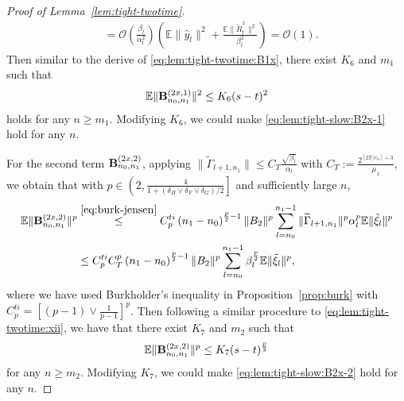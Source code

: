 \documentclass[11pt]{article}
\theoremstyle{plain}
\theoremstyle{definition}
\def\Hsmooth{{\delta_H}}
\def\Fsmooth{{\delta_F}}
\def\Gsmooth{{\delta_G}}
\def\cti{C^{ti}}
\def\OM{{\mathcal O}}
\def\EB{{\mathbb E}}
\newcommand{\yhat}{{\hat{y}}}
\newcommand{\ssum}[3]{\sum\limits_{{#1}={#2}}^{#3}}
\def\bfB{{\bf B}}
\begin{document}
\begin{appendix}
\begin{proof}[Proof of Lemma~\ref{lem:tight-twotime}]
\begin{align*}
        & = \OM \left( \frac{\beta_{l}}{\alpha_{l}^2} \right) \left( \EB \| \yhat_{l} \|^2 + \frac{ \EB \| \tilde{R}^x_{l} \|^2 }{ \beta_{l}^2 } \right) = \OM(1).
    \end{align*}
    Then similar to the derive of \eqref{eq:lem:tight-twotime:B1x}, there exist  $K_6$ and $m_1$ such that
    \begin{align}\label{eq:lem:tight-slow:B2x-1}
        \EB \| \bfB^{(2x,1)}_{n_0,n_1} \|^2 \le K_6 (s-t)^2
    \end{align}
    holds for any $n \ge m_1$.
    Modifying $K_6$, we could make \eqref{eq:lem:tight-slow:B2x-1} hold for any $n$.
    
    For the second term $\bfB^{(2x,2)}_{n_0,n_1}$,
    applying $\| \widetilde{\Gamma}_{l+1,n_1} \| \le C_T \frac{ \sqrt{\beta_{l}} }{ \alpha_{l} } $ with $C_T := \frac{ 2^{ \left\lceil 2T/c_\alpha \right\rceil + 3} }{\mu_1}$, we obtain that with $p \in \left(2, \frac{4}{1 + ( \Hsmooth \vee \Fsmooth \vee \Gsmooth )/2} \right]$ and sufficiently large $n$, 
    \begin{align*}
        \EB \| \bfB^{(2x,2)}_{n_0,n_1} \|^p
        & \overset{\eqref{eq:burk-jensen}}{\le} \cti_p \left( n_1 - n_0 \right)^{\frac{p}{2}-1} \| B_2 \|^p \ssum{l}{ n_0 }{n_1-1 } \| \widetilde{\Gamma}_{l+1, n_1} \|^p \alpha_{l}^p \EB \| \tilde{\xi}_{l} \|^p
        \\
        & \le \cti_p C_{T}^p \left( n_1 - n_0 \right)^{\frac{p}{2}-1} \| B_2 \|^p \ssum{l}{ n_0 }{n_1-1 } \beta_{l}^\frac{p}{2} \EB \| \tilde{\xi}_{l} \|^p,
    \end{align*}
    where we have used Burkholder's inequality in  Proposition~\ref{prop:burk} with $\cti_p = \left[ (p-1) \vee \frac{1}{p-1} \right]^p$.
    Then following a similar procedure to
    \eqref{eq:lem:tight-twotime:xii},
    we have that there exist $K_7$ and $m_2$ such that
    \begin{align}\label{eq:lem:tight-slow:B2x-2}
        \EB \| \bfB^{(2x,2)}_{n_0,n_1} \|^p \le K_7 (s-t)^\frac{p}{2}
    \end{align}
    for any $n \ge m_2$. Modifying $K_7$, we could make \eqref{eq:lem:tight-slow:B2x-2} hold for any $n$.
    

\end{proof}
\end{appendix}
\end{document}

